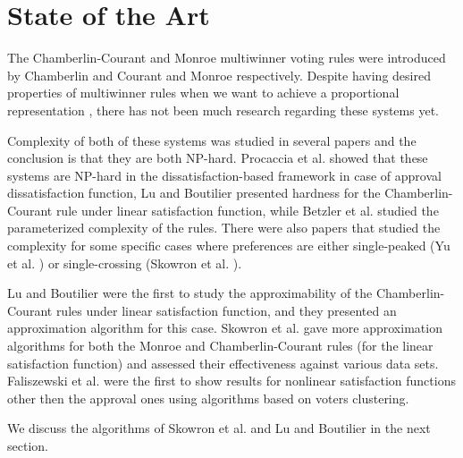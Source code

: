 \section{State of the Art}

The Chamberlin-Courant and Monroe multiwinner voting rules were introduced by Chamberlin and Courant \cite{9} and Monroe \cite{8} respectively. Despite having desired properties of multiwinner rules when we want to achieve a proportional representation \cite{10}, there has not been much research regarding these systems yet.

Complexity of both of these systems was studied in several papers and the conclusion is that they are both NP-hard. Procaccia et al. \cite{2} showed that these systems are NP-hard in the dissatisfaction-based framework in case of approval dissatisfaction function, Lu and Boutilier \cite{4} presented hardness for the Chamberlin-Courant rule under linear satisfaction function, while Betzler et al. \cite{3} studied the parameterized complexity of the rules. There were also papers that studied the complexity for some specific cases where preferences are either single-peaked (Yu et al. \cite{11}) or single-crossing (Skowron et al. \cite{12}).

Lu and Boutilier \cite{4} were the first to study the approximability of the Chamberlin-Courant rules under linear satisfaction function, and they presented an approximation algorithm for this case. Skowron et al. \cite{1} gave more approximation algorithms for both the Monroe and Chamberlin-Courant rules (for the linear satisfaction function) and assessed their effectiveness against various data sets. Faliszewski et al. \cite{14} were the first to show results for nonlinear satisfaction functions other then the approval ones using algorithms based on voters clustering.

We discuss the algorithms of Skowron et al. \cite{2} and Lu and Boutilier \cite{4} in the next section.